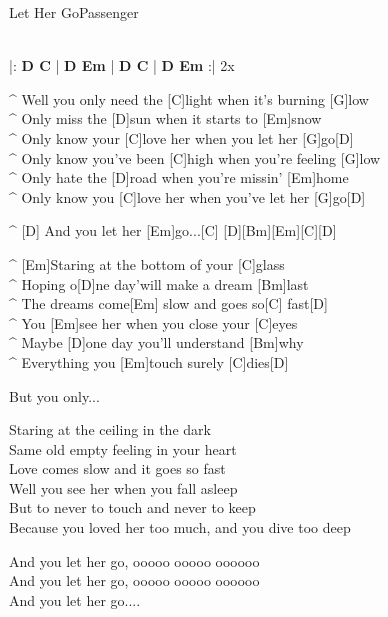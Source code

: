 \begin{song}{Let Her Go}{Passenger}


\\
|: \textbf{D C} | \textbf{D Em} | \textbf{D C} | \textbf{D Em} :| 2x

\medskip
{}
\begin{guitar}
^ Well you only need the [C]light when it's burning [G]low\\
^ Only miss the [D]sun when it starts to [Em]snow\\
^ Only know your [C]love her when you let her [G]go[D]\\
^ Only know you've been [C]high when you're feeling [G]low\\
^ Only hate the [D]road when you're missin' [Em]home\\
^ Only know you [C]love her when you've let her [G]go[D]\\
\end{guitar}

\begin{guitar}
^ [D]  And you let her [Em]go...[C] [D][Bm][Em][C][D]\\
\end{guitar}


\begin{guitar}
^ [Em]Staring at the bottom of your [C]glass\\
^ Hoping o[D]ne day'will make a dream [Bm]last\\
^ The dreams come[Em] slow and goes so[C] fast[D]\\
^ You [Em]see her when you close your [C]eyes\\
^ Maybe [D]one day you'll understand [Bm]why\\
^ Everything you [Em]touch surely [C]dies[D]\\
\end{guitar}


\begin{guitar}
But you only...\\
\end{guitar}


\begin{guitar}
Staring at the ceiling in the dark\\
Same old empty feeling in your heart\\
Love comes slow and it goes so fast\\
Well you see her when you fall asleep\\
But to never to touch and never to keep\\
Because you loved her too much, and you dive too deep\\
\end{guitar}



\begin{guitar}
And you let her go, ooooo ooooo oooooo\\
And you let her go, ooooo ooooo oooooo\\
And you let her go....\\
\end{guitar}


\end{song}
